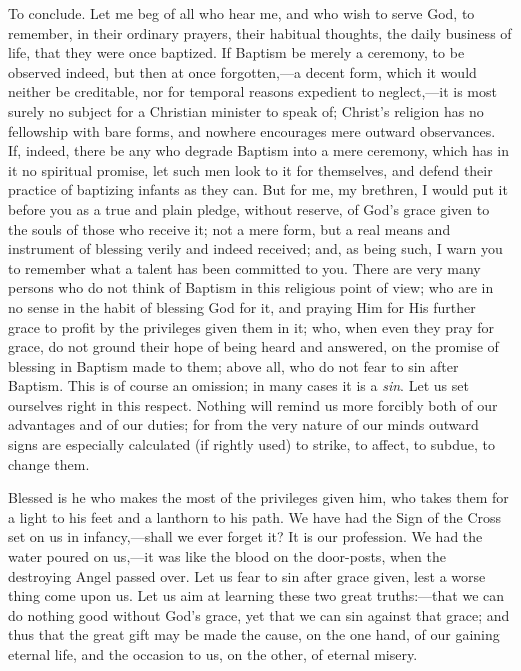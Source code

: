 To conclude. Let me beg of all who hear me, and who
wish to serve God, to remember, in their ordinary
prayers, their habitual thoughts, the daily business of
life, that they were once baptized. If Baptism be merely
a ceremony, to be observed indeed, but then at once
forgotten,—a decent form, which it would neither be
creditable, nor for temporal reasons expedient to
neglect,—it is most surely no subject for a
Christian minister to speak of; Christ's religion has no
fellowship with bare forms, and nowhere encourages mere
outward observances. If, indeed, there be any who degrade
Baptism into a mere ceremony, which has in it no
spiritual promise, let such men look to it for
themselves, and defend their practice of baptizing
infants as they can. But for me, my brethren, I would put
it before you as a true and plain pledge, without
reserve, of God's grace given to the souls of those who
receive it; not a mere form, but a real means and
instrument of blessing verily and indeed received; and,
as being such, I warn you to remember what a talent has
been committed to you. There are very many persons who do
not think of Baptism in this religious point of view; who
are in no sense in the habit of blessing God for it, and
praying Him for His further grace to profit by the
privileges given them in it; who, when even they pray for
grace, do not ground their hope of being heard and
answered, on the promise of blessing in Baptism made to
them; above all, who do not fear to sin after Baptism.
This is of course an omission; in many cases it is a \emph{sin}.
Let us set ourselves right in this respect. Nothing will
remind us more forcibly both of our advantages and of our
duties; for from the very nature of our minds outward
signs are especially calculated (if rightly used) to
strike, to affect, to subdue, to change them.

Blessed is he who makes the most of the privileges
given him, who takes them for a light to his feet and a
lanthorn to his path. We have had the Sign of the Cross
set on us in infancy,—shall we ever forget it? It is
our profession. We had the water poured on us,—it
was like the blood on the door-posts, when the destroying
Angel passed over. Let us fear to sin after grace given,
lest a worse thing come upon us. Let us aim at learning
these two great truths:—that we can do nothing good
without God's grace, yet that we can sin against that
grace; and thus that the great gift may be made the
cause, on the one hand, of our gaining eternal life, and
the occasion to us, on the other, of eternal misery.

